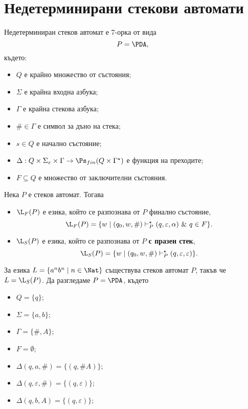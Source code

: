 \section{Недетерминирани стекови автомати}

\begin{dfn}
  Недетерминиран стеков автомат е 7-орка от вида
  \[P = \PDA,\] където:
  \begin{itemize}
  \item
    $Q$ е крайно множество от състояния;
  \item  
    $\Sigma$ е крайна входна азбука;
  \item
    $\Gamma$ е крайна стекова азбука;
  \item
    $\# \in \Gamma$ е символ за дъно на стека;
  \item
    $s\in Q$ е начално състояние;
  \item
    $\Delta:Q\times\Sigma_\varepsilon\times\Gamma\rightarrow \Ps_{fin}(Q\times\Gamma^\star)$ 
    е функция на преходите;    
  \item
    $F\subseteq Q$ е множество от заключителни състояния.
  \end{itemize}
\end{dfn}

Нека $P$ е стеков автомат. Тогава
\begin{itemize}
\item
  $\L_F(P)$ е езика, който се разпознава от $P$ { финално състояние},
  \[\L_F(P) = \{w\mid (q_0,w,\#) \vdash^\star_P (q,\varepsilon,\alpha)\ \&\ q \in F\}.\]    
\item
  $\L_S(P)$ е езика, който се разпознава от $P$  {\bf с празен стек},
  \[\L_S(P) = \{w\mid (q_0,w,\#) \vdash^\star_P (q,\varepsilon,\varepsilon)\}.\]    
\end{itemize}

\begin{example}
  За езика $L = \{a^nb^n\mid n\in\Nat\}$ съществува стеков автомат $P$, такъв че
  $L = \L_S(P)$.
  Да разгледаме $P = \PDA$, където
  \begin{itemize}
  \item
    $Q = \{q\}$;
  \item
    $\Sigma = \{a,b\}$;
  \item
    $\Gamma = \{\#,A\}$;
  \item
    $F = \emptyset$;
  \item 
    $\Delta(q,a,\#) = \{(q,\# A)\}$;
  \item 
    $\Delta(q,\varepsilon,\#) = \{(q,\varepsilon)\}$;
  \item 
    $\Delta(q,b,A) = \{(q,\varepsilon)\}$;
  \end{itemize}
\end{example}


